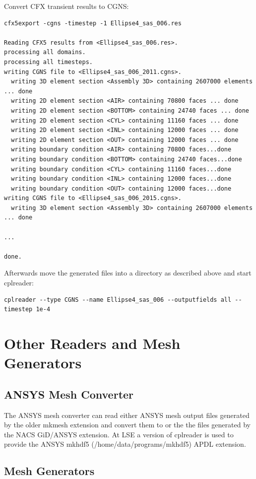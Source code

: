 \documentclass[a4paper,10pt]{article}
\begin{document}
Convert CFX transient results to CGNS:

\begin{verbatim}
cfx5export -cgns -timestep -1 Ellipse4_sas_006.res

Reading CFX5 results from <Ellipse4_sas_006.res>.
processing all domains.
processing all timesteps.
writing CGNS file to <Ellipse4_sas_006_2011.cgns>.
  writing 3D element section <Assembly 3D> containing 2607000 elements ... done
  writing 2D element section <AIR> containing 70800 faces ... done
  writing 2D element section <BOTTOM> containing 24740 faces ... done
  writing 2D element section <CYL> containing 11160 faces ... done
  writing 2D element section <INL> containing 12000 faces ... done
  writing 2D element section <OUT> containing 12000 faces ... done
  writing boundary condition <AIR> containing 70800 faces...done
  writing boundary condition <BOTTOM> containing 24740 faces...done
  writing boundary condition <CYL> containing 11160 faces...done
  writing boundary condition <INL> containing 12000 faces...done
  writing boundary condition <OUT> containing 12000 faces...done
writing CGNS file to <Ellipse4_sas_006_2015.cgns>.
  writing 3D element section <Assembly 3D> containing 2607000 elements ... done

...

done.
\end{verbatim}%
%
Afterwards move  the generated files into  a directory as  described above and
start cplreader:

\begin{verbatim}
cplreader --type CGNS --name Ellipse4_sas_006 --outputfields all --timestep 1e-4
\end{verbatim}

\newpage
\section{Other Readers and Mesh Generators}
\subsection{ANSYS Mesh Converter}
\label{sec:ansys}

The ANSYS mesh converter can read  either ANSYS mesh output files generated by
the older mkmesh extension and convert them to \hdf or the the files generated
by the  NACS GiD/ANSYS  extension. At LSE  a version  of cplreader is  used to
provide the ANSYS mkhdf5 (/home/data/programs/mkhdf5) APDL extension.

\subsection{Mesh Generators}
\label{sec:gengrids}
\end{document}
